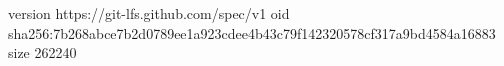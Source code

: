 version https://git-lfs.github.com/spec/v1
oid sha256:7b268abce7b2d0789ee1a923cdee4b43c79f142320578cf317a9bd4584a16883
size 262240
